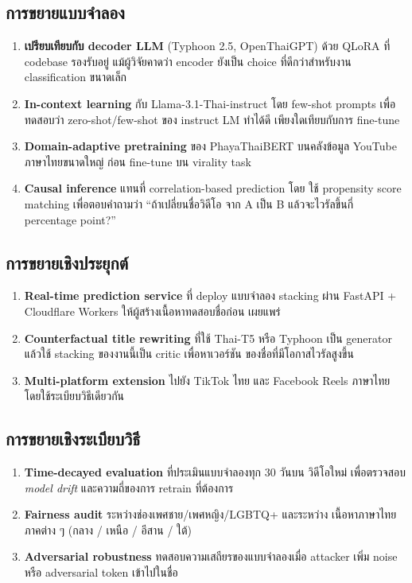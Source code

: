 \subsection{การขยายแบบจำลอง}
\begin{enumerate}[leftmargin=2em]
  \item \textbf{เปรียบเทียบกับ decoder LLM} (Typhoon 2.5, OpenThaiGPT)
        ด้วย QLoRA ที่ codebase รองรับอยู่ แม้ผู้วิจัยคาดว่า encoder ยังเป็น
        choice ที่ดีกว่าสำหรับงาน classification ขนาดเล็ก
  \item \textbf{In-context learning} กับ Llama-3.1-Thai-instruct โดย few-shot
        prompts เพื่อทดสอบว่า zero-shot/few-shot ของ instruct LM ทำได้ดี
        เพียงใดเทียบกับการ fine-tune
  \item \textbf{Domain-adaptive pretraining} ของ PhayaThaiBERT บนคลังข้อมูล
        YouTube ภาษาไทยขนาดใหญ่ ก่อน fine-tune บน virality task
  \item \textbf{Causal inference} แทนที่ correlation-based prediction โดย
        ใช้ propensity score matching เพื่อตอบคำถามว่า ``ถ้าเปลี่ยนชื่อวิดีโอ
        จาก A เป็น B แล้วจะไวรัลขึ้นกี่ percentage point?''
\end{enumerate}

\subsection{การขยายเชิงประยุกต์}
\begin{enumerate}[leftmargin=2em]
  \item \textbf{Real-time prediction service} ที่ deploy แบบจำลอง stacking
        ผ่าน FastAPI + Cloudflare Workers ให้ผู้สร้างเนื้อหาทดสอบชื่อก่อน
        เผยแพร่
  \item \textbf{Counterfactual title rewriting} ที่ใช้ Thai-T5 หรือ Typhoon
        เป็น generator แล้วใช้ stacking ของงานนี้เป็น critic เพื่อหาเวอร์ชัน
        ของชื่อที่มีโอกาสไวรัลสูงขึ้น
  \item \textbf{Multi-platform extension} ไปยัง TikTok ไทย และ Facebook
        Reels ภาษาไทย โดยใช้ระเบียบวิธีเดียวกัน
\end{enumerate}

\subsection{การขยายเชิงระเบียบวิธี}
\begin{enumerate}[leftmargin=2em]
  \item \textbf{Time-decayed evaluation} ที่ประเมินแบบจำลองทุก 30 วันบน
        วิดีโอใหม่ เพื่อตรวจสอบ \emph{model drift} และความถี่ของการ retrain
        ที่ต้องการ
  \item \textbf{Fairness audit} ระหว่างช่องเพศชาย/เพศหญิง/LGBTQ+ และระหว่าง
        เนื้อหาภาษาไทยภาคต่าง ๆ (กลาง / เหนือ / อีสาน / ใต้)
  \item \textbf{Adversarial robustness} ทดสอบความเสถียรของแบบจำลองเมื่อ
        attacker เพิ่ม noise หรือ adversarial token เข้าไปในชื่อ
\end{enumerate}

